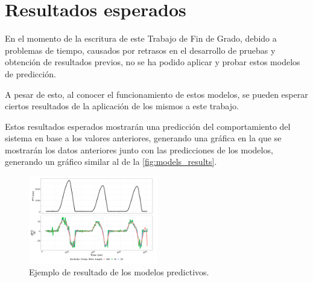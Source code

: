 \section{Resultados esperados} \label{sct:desarrollo_resultadosesperados}

En el momento de la escritura de este Trabajo de Fin de Grado, debido a 
problemas de tiempo, causados por retrasos en el desarrollo de pruebas y 
obtención de resultados previos, no se ha podido aplicar y probar estos
modelos de predicción.

A pesar de esto, al conocer el funcionamiento de estos modelos, se pueden
esperar ciertos resultados de la aplicación de los mismos a este trabajo.

Estos resultados esperados mostrarán una predicción del comportamiento del sistema
en base a los valores anteriores, generando una gráfica en la que se mostrarán
los datos anteriores junto con las predicciones de los modelos, generando un
gráfico similar al de la \autoref{fig:models_results}.

\begin{figure}[htpb]
    \centering
    \includegraphics[width=0.5\textwidth]{images/ejemplo-res.png}
    \caption{Ejemplo de resultado de los modelos predictivos.}
    \label{fig:models_results}
\end{figure}